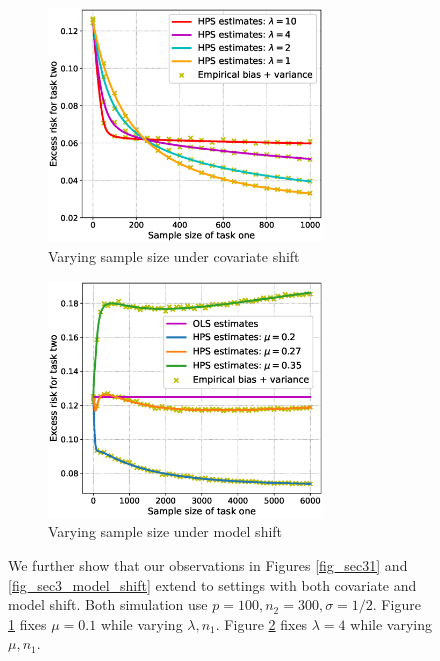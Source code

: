 \begin{figure}[!t]
	\begin{subfigure}[b]{0.5\textwidth}
		\centering
		\includegraphics[width=0.8\textwidth]{figures/covariate_and_model_shift_a.eps}
		\caption{Varying sample size under covariate shift}
		\label{fig_sec3_cov_mo_a}
	\end{subfigure}
	\begin{subfigure}[b]{0.5\textwidth}
		\centering
		\includegraphics[width=0.8\textwidth]{figures/covariate_and_model_shift_b.eps}
		\caption{Varying sample size under model shift}
		\label{fig_sec3_cov_mo_b}
	\end{subfigure}
	\caption{We further show that our observations in Figures \ref{fig_sec31} and \ref{fig_sec3_model_shift} extend to settings with both covariate and model shift.
	Both simulation use $p = 100, n_2 = 300, \sigma = 1/2$.
	Figure \ref{fig_sec3_cov_mo_a} fixes $\mu = 0.1$ while varying $\lambda, n_1$.
	Figure \ref{fig_sec3_cov_mo_b} fixes $\lambda = 4$ while varying $\mu, n_1$.}
	\label{fig_sec33}
\end{figure}

